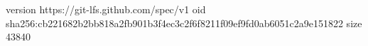 version https://git-lfs.github.com/spec/v1
oid sha256:cb221682b2bb818a2fb901b3f4ec3c2f6f8211f09ef9fd0ab6051c2a9e151822
size 43840
